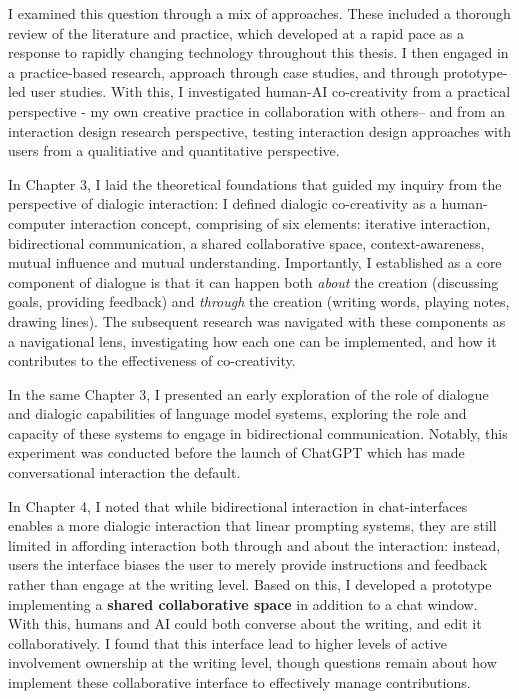 I examined this question through a mix of approaches. These included a thorough review of the literature and practice, which developed at a rapid pace as a response to rapidly changing technology throughout this thesis. I then engaged in a practice-based research, approach through case studies, and through prototype-led user studies. With this, I investigated human-AI co-creativity from a practical perspective - my own creative practice in collaboration with others-- and from an interaction design research perspective, testing interaction design approaches with users from a qualitiative and quantitative perspective. 

In Chapter 3, I laid the theoretical foundations that guided my inquiry from the perspective of dialogic interaction: I defined dialogic co-creativity as a human-computer interaction concept, comprising of six elements: iterative interaction, bidirectional communication, a shared collaborative space, context-awareness, mutual influence and mutual understanding. Importantly, I established as a core component of dialogue is that it can happen both \textit{about} the creation (discussing goals, providing feedback) and \textit{through} the creation (writing words, playing notes, drawing lines). The subsequent research was navigated with these components as a navigational lens, investigating how each one can be implemented, and how it contributes to the effectiveness of co-creativity. 

In the same Chapter 3, I presented an early exploration of the role of dialogue and dialogic capabilities of language model systems, exploring the role and capacity of these systems to engage in bidirectional communication. Notably, this experiment was conducted before the launch of ChatGPT which has made conversational interaction the default. 

In Chapter 4, I noted that while bidirectional interaction in chat-interfaces enables a more dialogic interaction that linear prompting systems, they are still limited in affording interaction both through and about the interaction: instead, users the interface biases the user to merely provide instructions and feedback rather than engage at the writing level. Based on this, I developed a prototype implementing a \textbf{shared collaborative space} in addition to a chat window. With this, humans and AI could both converse about the writing, and edit it collaboratively. I found that this interface lead to higher levels of active involvement ownership at the writing level, though questions remain about how implement these collaborative interface to effectively manage contributions.

